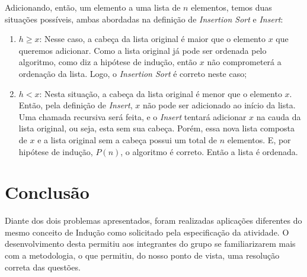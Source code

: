 \documentclass[a4paper, 10pt]{article}
\begin{document}
Adicionando, então, um elemento a uma lista de $n$ elementos, temos duas situações possíveis, ambas abordadas na definição de \textit{Insertion Sort} e \textit{Insert}:
\begin{enumerate}
	\item $h \geq x$: Nesse caso, a cabeça da lista original é maior que o elemento $x$ que queremos adicionar. Como a lista original já pode ser ordenada pelo algoritmo, como diz a hipótese de indução, então $x$ não comprometerá a ordenação da lista. Logo, o \textit{Insertion Sort} é correto neste caso;
    \item $h < x$: Nesta situação, a cabeça da lista original é menor que o elemento $x$. Então, pela definição de \textit{Insert}, $x$ não pode ser adicionado ao início da lista. Uma chamada recursiva será feita, e o \textit{Insert} tentará adicionar $x$ na cauda da lista original, ou seja, esta sem sua cabeça. Porém, essa nova lista composta de $x$ e a lista original sem a cabeça possui um total de $n$ elementos. E, por hipótese de indução, $P(n)$, o algoritmo é correto. Então a lista é ordenada.
\end{enumerate}


\section{Conclusão}

Diante dos dois problemas apresentados, foram realizadas aplicações diferentes do mesmo conceito de Indução como solicitado pela especificação da atividade. O desenvolvimento desta permitiu aos integrantes do grupo se familiarizarem mais com a metodologia, o que permitiu, do nosso ponto de vista, uma resolução correta das questões.
\end{document}
